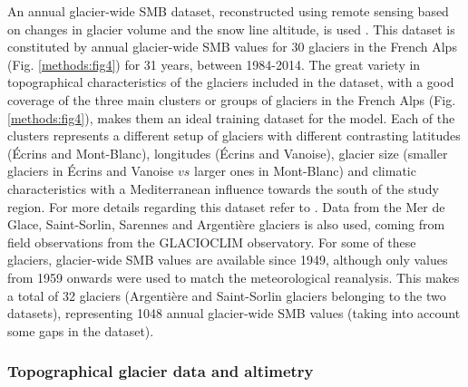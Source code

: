 An annual glacier-wide SMB dataset, reconstructed using remote sensing based on changes in glacier volume and the snow line altitude, is used \citep{rabatel_spatio-temporal_2016}. This dataset is constituted by annual glacier-wide SMB values for 30 glaciers in the French Alps (Fig. \ref{methods:fig4}) for 31 years, between 1984-2014. The great variety in topographical characteristics of the glaciers included in the dataset, with a good coverage of the three main clusters or groups of glaciers in the French Alps (Fig. \ref{methods:fig4}), makes them an ideal training dataset for the model. Each of the clusters represents a different setup of glaciers with different contrasting latitudes (Écrins and Mont-Blanc), longitudes (Écrins and Vanoise), glacier size (smaller glaciers in Écrins and Vanoise $vs$ larger ones in Mont-Blanc) and climatic characteristics with a Mediterranean influence towards the south of the study region. For more details regarding this dataset refer to \citet{rabatel_spatio-temporal_2016}. Data from the Mer de Glace, Saint-Sorlin, Sarennes and Argentière glaciers is also used, coming from field observations from the GLACIOCLIM observatory. For some of these glaciers, glacier-wide SMB values are available since 1949, although only values from 1959 onwards were used to match the meteorological reanalysis. This makes a total of 32 glaciers (Argentière and Saint-Sorlin glaciers belonging to the two datasets), representing 1048 annual glacier-wide SMB values (taking into account some gaps in the dataset).

\subsubsection{Topographical glacier data and altimetry} 

